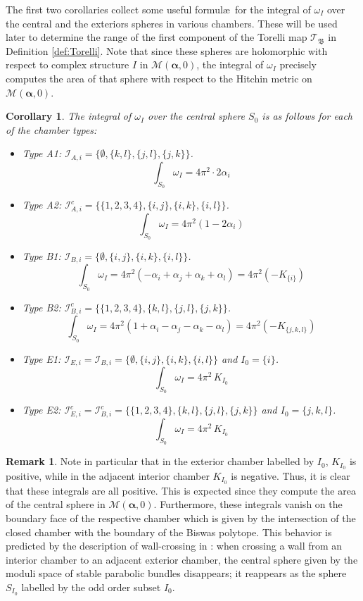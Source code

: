 \documentclass[12pt,letterpaper,reqno]{amsart}
\def\mathbf#1{#1}%
\newtheorem{cor}[thm]{Corollary}
\theoremstyle{remark}
\theoremstyle{definition}
\newtheorem{rem}[thm]{Remark}
\numberwithin{thm}{section}
\numberwithin{equation}{section}
\numberwithin{figure}{section}
\newcommand{\cM}{\ensuremath{\mathcal M}}
\begin{document}
\medskip
 
The first two corollaries collect some useful formul\ae\ for the integral of $\omega_I$ over the central and the exteriors spheres in various chambers. These will be used later to determine the range of the first component of the Torelli map $\mathcal{T}_{\mathfrak B}$ in Definition \ref{def:Torelli}. Note that since these spheres are holomorphic with respect to complex structure $I$ in $\cM(\boldsymbol{\alpha}, \mathbf{0})$, the integral of $\omega_I$ precisely computes the area of that sphere with respect to the Hitchin metric on $\cM(\boldsymbol{\alpha}, \mathbf{0})$.

\begin{cor}\label{cor:centralvolumes}
The integral of $\omega_I$  over the central sphere $S_0$ is as follows for each of the chamber types:
\smallskip
  \begin{itemize}
    \item Type A1: $\mathcal{I}_{A, i}=\{\emptyset, \{k,l\}, \{j,l\}, \{j,k\}\}$. 
    \[\int_{S_0} \omega_I=4 \pi^2 \cdot 2\alpha_i\]
    \item Type A2: $\mathcal{I}_{A, i}^c=\{\{1, 2, 3, 4\}, \{i,j\}, \{i,k\}, \{i,l\}\}$.  \[\int_{S_0} \omega_I=4\pi^2\left(1- 2\alpha_i\right) \]
    \item Type B1: $\mathcal{I}_{B, i}=\{\emptyset, \{i,j\}, \{i,k\}, \{i,l\}\}$.   \[\int_{S_0} \omega_I= 4 \pi^2 \left( -\alpha_i + \alpha_j +\alpha_k + \alpha_l \right)= 
    4 \pi^2 \left( - K_{\{i\}}\right)  \]
    \item  Type B2: $\mathcal{I}_{B, i}^c=\{ \{1, 2, 3, 4\}, \{k,l\}, \{j,l\}, \{j,k\}\}$.   \[\int_{S_0} \omega_I=4 \pi^2 \left( 1+ \alpha_i -  \alpha_j -  \alpha_k - \alpha_l\right) 
    = 4\pi^2 \left(- K_{\{j, k, l\}} \right)\]
    \item Type E1: $\mathcal{I}_{E, i}=\mathcal{I}_{B, i}=\{\emptyset, \{i,j\}, \{i,k\}, \{i,l\}\}$ and $I_0=\{i\}$.
    \[ \int_{S_0} \omega_I = 4 \pi^2 \, K_{I_0}\]
    \item Type E2: $\mathcal{I}_{E, i}^c=\mathcal{I}_{B, i}^c=\{ \{1, 2, 3, 4\}, \{k,l\}, \{j,l\}, \{j,k\}\}$ and $I_0=\{j, k, l\}$.
    \[ \int_{S_0} \omega_I = 4 \pi^2 \,K_{I_0} \]
    \end{itemize}
\end{cor}
    \begin{rem}
      Note in particular that in the exterior chamber labelled by $I_0$, $K_{I_0}$ is positive, while in the adjacent interior chamber $K_{I_0}$ is negative. Thus, it is clear that these integrals are all positive. This is expected since they compute the area of the central sphere in $\cM(\boldsymbol{\alpha}, \mathbf{0})$. Furthermore, these integrals vanish on the boundary face of the respective chamber which is given by the intersection of the closed chamber with the boundary of the Biswas polytope. This behavior is predicted by the description of wall-crossing in \cite{Meneses}: when crossing a wall from an interior chamber to an adjacent exterior chamber, the central sphere given by the moduli space of stable parabolic bundles disappears; it reappears as the sphere $S_{I_0}$ labelled by the odd order subset $I_0$.  
    \end{rem}
 
\end{document}
